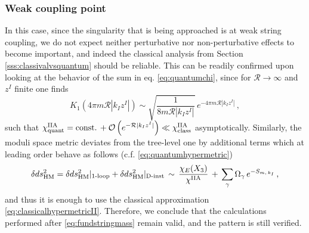 \subsubsection*{Weak coupling point}
	
In this case, since the singularity that is being approached is at weak string coupling, we do not expect neither perturbative nor non-perturbative effects to become important, and indeed the classical analysis from Section \ref{sss:classivalvsquantum} should be reliable. This can be readily confirmed upon looking at the behavior of the sum in eq. \eqref{eq:quantumchi}, since for $\mathcal{R} \to \infty$ and $z^I$ finite one finds
%
\begin{equation}\label{eq:asympotic Bessel infinity}
	K_1 \left( 4\pi m \mathcal{R}|k_I z^I|\right) \sim \sqrt{\frac{1}{8m \mathcal{R}|k_I z^I|}}\, e^{-4\pi m \mathcal{R}|k_I z^I|} %
	\, ,
\end{equation}
%
such that $\chi^{\rm IIA}_{\rm quant}= \text{const.}\, + \mathcal{O}\left( e^{-\mathcal{R}|k_I z^I|}\right) \ll \chi^{\rm IIA}_{\rm class}$ asymptotically. Similarly, the moduli space metric deviates from the tree-level one by additional terms which at leading order behave as follows (c.f. \eqref{eq:quantumhypermetric}) 
%
\begin{equation}
	\delta  d s_{\rm HM}^2 =  \delta  d s_{\rm HM}^2\rvert_{\text{1-loop}} + \delta  d s_{\rm HM}^2\rvert_{\text{D-inst}}\, \sim\, \frac{\chi_{E}(X_3)}{\chi^{\rm IIA}}\, +\, \sum_{\gamma} \Omega_{\gamma}\, e^{-S_{m,\, k_I}}\, ,
\end{equation}
%
and thus it is enough to use the classical approximation \eqref{eq:classicalhypermetricII}. Therefore, we conclude that the calculations performed after \eqref{eq:fundstringmass} remain valid, and the pattern is still verified.
	
